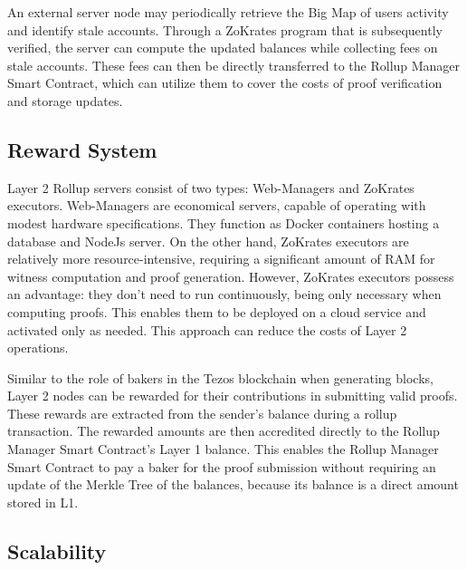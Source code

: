 An external server node may periodically retrieve the Big Map of users activity and identify stale accounts. Through a ZoKrates program that is subsequently verified, the server can compute the updated balances while collecting fees on stale accounts. These fees can then be directly transferred to the Rollup Manager Smart Contract, which can utilize them to cover the costs of proof verification and storage updates.

\subsection{Reward System}

Layer 2 Rollup servers consist of two types: Web-Managers and ZoKrates executors. Web-Managers are economical servers, capable of operating with modest hardware specifications. They function as Docker containers hosting a database and NodeJs server. On the other hand, ZoKrates executors are relatively more resource-intensive, requiring a significant amount of RAM for witness computation and proof generation. However, ZoKrates executors possess an advantage: they don't need to run continuously, being only necessary when computing proofs. This enables them to be deployed on a cloud service and activated only as needed. This approach can reduce the costs of Layer 2 operations.

Similar to the role of bakers in the Tezos blockchain when generating blocks, Layer 2 nodes can be rewarded for their contributions in submitting valid proofs. These rewards are extracted from the sender's balance during a rollup transaction. The rewarded amounts are then accredited directly to the Rollup Manager Smart Contract's Layer 1 balance. This enables the Rollup Manager Smart Contract to pay a baker for the proof submission without requiring an update of the Merkle Tree of the balances, because its balance is a direct amount stored in L1.

\subsection{Scalability}

